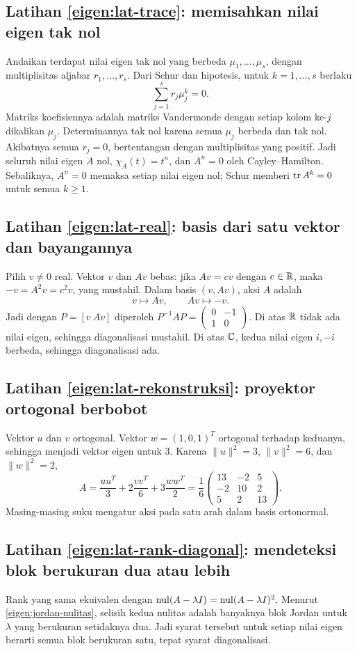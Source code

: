 \subsection*{Latihan \ref{eigen:lat-trace}: memisahkan nilai eigen tak nol}
Andaikan terdapat nilai eigen tak nol yang berbeda
$\mu_1,\ldots,\mu_s$, dengan multiplisitas aljabar $r_1,\ldots,r_s$.
Dari Schur dan hipotesis, untuk $k=1,\ldots,s$ berlaku
\[
    \sum_{j=1}^s r_j\mu_j^k=0.
\]
Matriks koefisiennya adalah matriks Vandermonde dengan setiap kolom
ke-$j$ dikalikan $\mu_j$. Determinannya tak nol karena semua $\mu_j$
berbeda dan tak nol. Akibatnya semua $r_j=0$, bertentangan dengan
multiplisitas yang positif.
Jadi seluruh nilai eigen $A$ nol, $\chi_A(t)=t^n$, dan $A^n=0$
oleh Cayley--Hamilton.
Sebaliknya, $A^n=0$ memaksa setiap nilai eigen nol; Schur memberi
$\operatorname{tr} A^k=0$ untuk semua $k\ge1$.

\subsection*{Latihan \ref{eigen:lat-real}: basis dari satu vektor dan bayangannya}
Pilih $v\ne0$ real. Vektor $v$ dan $Av$ bebas: jika $Av=cv$
dengan $c\in\mathbb{R}$, maka $-v=A^2v=c^2v$, yang mustahil.
Dalam basis $(v,Av)$, aksi $A$ adalah
\[
    v\longmapsto Av,\qquad Av\longmapsto-v.
\]
Jadi dengan $P=[v\ Av]$ diperoleh
$P^{-1}AP=\begin{pmatrix}0&-1\\1&0\end{pmatrix}$.
Di atas $\mathbb{R}$ tidak ada nilai eigen, sehingga diagonalisasi mustahil.
Di atas $\mathbb{C}$, kedua nilai eigen $i,-i$ berbeda, sehingga diagonalisasi ada.

\subsection*{Latihan \ref{eigen:lat-rekonstruksi}: proyektor ortogonal berbobot}
Vektor $u$ dan $v$ ortogonal. Vektor $w=(1,0,1)^T$ ortogonal terhadap
keduanya, sehingga menjadi vektor eigen untuk $3$.
Karena $\|u\|^2=3$, $\|v\|^2=6$, dan $\|w\|^2=2$,
\[
    A=\frac{uu^T}{3}+2\frac{vv^T}{6}+3\frac{ww^T}{2}
    =\frac16\begin{pmatrix}13&-2&5\\-2&10&2\\5&2&13\end{pmatrix}.
\]
Masing-masing suku mengatur aksi pada satu arah dalam basis ortonormal.

\subsection*{Latihan \ref{eigen:lat-rank-diagonal}: mendeteksi blok berukuran dua atau lebih}
Rank yang sama ekuivalen dengan
$\operatorname{nul}(A-\lambda I)=\operatorname{nul}(A-\lambda I)^2$.
Menurut \autoref{eigen:jordan-nulitas}, selisih kedua nulitas adalah
banyaknya blok Jordan untuk $\lambda$ yang berukuran setidaknya dua.
Jadi syarat tersebut untuk setiap nilai eigen berarti semua blok
berukuran satu, tepat syarat diagonalisasi.

